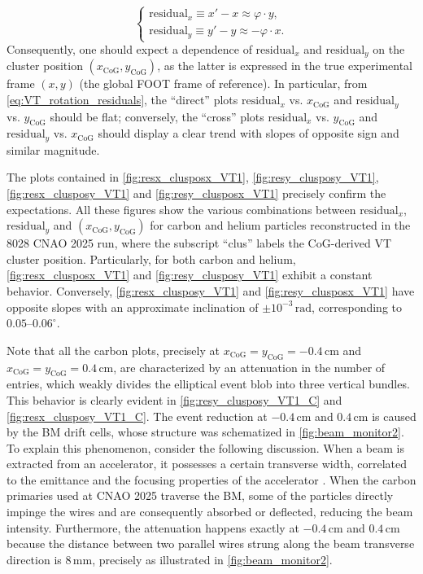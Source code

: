\begin{equation}
	\begin{cases}
		\text{residual}_x \equiv x' - x \approx \varphi \cdot y, \\
		\text{residual}_y \equiv y' - y \approx -\varphi\cdot x.
	\end{cases}
	\label{eq:VT_rotation_residuals}
\end{equation}
Consequently, one should expect a dependence of $\text{residual}_x$ and $\text{residual}_y$ on the cluster position $(x_{\mathrm{CoG}},y_{\mathrm{CoG}})$, as the latter is expressed in the true experimental frame $(x,y)$ (the global FOOT frame of reference). In particular, from \autoref{eq:VT_rotation_residuals}, the ``direct'' plots $\text{residual}_x$ vs. $x_{\mathrm{CoG}}$ and $\text{residual}_y$ vs. $y_{\mathrm{CoG}}$ should be flat; conversely, the ``cross'' plots $\text{residual}_x$ vs. $y_{\mathrm{CoG}}$ and $\text{residual}_y$ vs. $x_{\mathrm{CoG}}$ should display a clear trend with slopes of opposite sign and similar magnitude.

The plots contained in \autoref{fig:resx_clusposx_VT1}, \autoref{fig:resy_clusposy_VT1}, \autoref{fig:resx_clusposy_VT1} and \autoref{fig:resy_clusposx_VT1} precisely confirm the expectations. All these figures show the various combinations between $\text{residual}_x$, $\text{residual}_y$ and $(x_{\mathrm{CoG}},y_{\mathrm{CoG}})$ for carbon and helium particles reconstructed in the 8028 CNAO 2025 run, where the subscript ``clus'' labels the CoG-derived VT cluster position. Particularly, for both carbon and helium, \autoref{fig:resx_clusposx_VT1} and \autoref{fig:resy_clusposy_VT1} exhibit a constant behavior. Conversely, \autoref{fig:resx_clusposy_VT1} and \autoref{fig:resy_clusposx_VT1} have opposite slopes with an approximate inclination of $\pm10^{-3}\,\mathrm{rad}$, corresponding to $0.05$--$0.06^\circ$.

Note that all the carbon plots, precisely at $x_\mathrm{CoG}=y_\mathrm{CoG}=-0.4\,\mathrm{cm}$ and $x_\mathrm{CoG}=y_\mathrm{CoG}=0.4\,\mathrm{cm}$, are characterized by an attenuation in the number of entries, which weakly divides the elliptical event blob into three vertical bundles. This behavior is clearly evident in \autoref{fig:resy_clusposy_VT1_C} and \autoref{fig:resx_clusposy_VT1_C}. The event reduction at $-0.4\,\mathrm{cm}$ and $0.4\,\mathrm{cm}$ is caused by the BM drift cells, whose structure was schematized in \autoref{fig:beam_monitor2}. To explain this phenomenon, consider the following discussion. When a beam is extracted from an accelerator, it possesses a certain transverse width, correlated to the emittance and the focusing properties of the accelerator \cite{Holzer:2024ohn}. When the carbon primaries used at CNAO 2025 traverse the BM, some of the particles directly impinge the wires and are consequently absorbed or deflected, reducing the beam intensity. Furthermore, the attenuation happens exactly at $-0.4\,\mathrm{cm}$ and $0.4\,\mathrm{cm}$ because the distance between two parallel wires strung along the beam transverse direction is $8\,\mathrm{mm}$, precisely as illustrated in \autoref{fig:beam_monitor2}.


